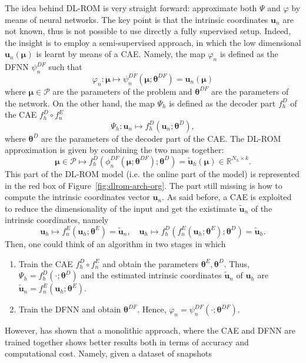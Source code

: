 \documentclass[11pt]{article}
\begin{document}
The idea behind DL-ROM is very straight forward: approximate both $\Psi$ and $\varphi$ by means of neural networks. The key point is that the intrinsic coordinates $\mathbf u_n$ are not known, thus is not possible to use directly a fully supervised setup. Indeed, the insight is to employ a semi-supervised approach, in which the low dimensional $\mathbf u_n(\boldsymbol \mu)$ is learnt by means of a CAE. Namely, the map $\varphi_n$ is defined as the DFNN $\psi_n^{DF}$ such that
$$\varphi_n: \boldsymbol \mu \mapsto \psi_n^{DF}(\boldsymbol \mu; \boldsymbol \theta^{DF}) = \mathbf u_n(\boldsymbol \mu)$$
where $\boldsymbol \mu \in \mathcal{P}$ are the parameters of the problem and $\boldsymbol  \theta^{DF}$ are the parameters of the network. On the other hand, the map $\Psi_h$ is defined as the decoder part $f_h^D$ of the CAE $f_h^D \circ f_n^E$
$$\Psi_h: \mathbf u_n \mapsto f_h^D(\mathbf u_n; \boldsymbol \theta^D),$$
where $\boldsymbol \theta^D$ are the parameters of the decoder part of the CAE. The DL-ROM approximation is given by combining the two maps together:
$$\boldsymbol \mu \in \mathcal P \mapsto f_h^D(\phi_n^{DF}(\boldsymbol \mu; \boldsymbol \theta^{DF}); \boldsymbol \theta^D)= \tilde{\mathbf u}_h(\boldsymbol \mu) \in \mathbb R^{N_h \times k}.$$
This part of the DL-ROM model (i.e. the online part of the model) is represented in the red box of Figure~\ref{fig:dlrom-arch-org}. The part still missing is how to compute the intrinsic coordinates vector $\mathbf u_n$. As said before, a CAE is exploited to reduce the dimensionality of the input and get the existimate $\tilde{\mathbf u}_n$ of the intrinsic coordinates, namely
$$\mathbf u_h \mapsto f_n^E(\mathbf u_h; \boldsymbol \theta^E) = \tilde{\mathbf u}_n, \quad \mathbf u_h \mapsto f_h^D(f_n^E(\mathbf u_h; \boldsymbol \theta^E); \boldsymbol \theta^D) = \tilde{\mathbf u}_h.$$
Then, one could think of an algorithm in two stages in which 
\begin{enumerate}
    \item Train the CAE $f_h^D \circ f_n^E$ and obtain the parameters $\boldsymbol \theta^E, \boldsymbol \theta^D$. Thus, $\Psi_h = f_h^D(\cdot; \boldsymbol \theta^D)$ and the estimated intrinsic coordinates $\tilde{\mathbf u}_n$ of $\mathbf u_h$ are $\tilde{\mathbf u}_n = f_n^E(\mathbf u_h; \boldsymbol \theta^E)$.
    \item Train the DFNN and obtain $\boldsymbol \theta^{DF}$. Hence, $\varphi_n = \psi_n^{DF}(\cdot; \boldsymbol \theta^{DF})$.
\end{enumerate}
However, \cite{fresca2021comprehensive} has shown that a monolithic approach, where the CAE and DFNN are trained together shows better results both in terms of accuracy and computational cost. Namely, given a dataset of snapshots 
\end{document}
